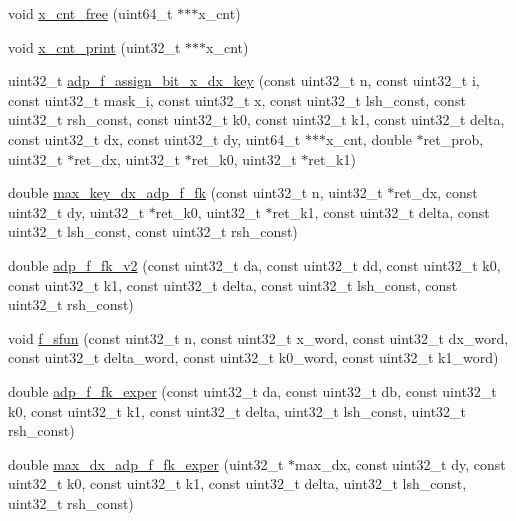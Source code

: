 \begin{DoxyCompactItemize}
void \hyperlink{adp-tea-f-fk_8cc_a0f892e305090fbfd0ff4572ba6930496}{x\-\_\-cnt\-\_\-free} (uint64\-\_\-t $\ast$$\ast$$\ast$x\-\_\-cnt)
\item 
void \hyperlink{adp-tea-f-fk_8cc_a41169fd6ba69f9384b6274c597b473bf}{x\-\_\-cnt\-\_\-print} (uint32\-\_\-t $\ast$$\ast$$\ast$x\-\_\-cnt)
\item 
uint32\-\_\-t \hyperlink{adp-tea-f-fk_8cc_af150550e5c149d5ded3b70aff98e6bd6}{adp\-\_\-f\-\_\-assign\-\_\-bit\-\_\-x\-\_\-dx\-\_\-key} (const uint32\-\_\-t n, const uint32\-\_\-t i, const uint32\-\_\-t mask\-\_\-i, const uint32\-\_\-t x, const uint32\-\_\-t lsh\-\_\-const, const uint32\-\_\-t rsh\-\_\-const, const uint32\-\_\-t k0, const uint32\-\_\-t k1, const uint32\-\_\-t delta, const uint32\-\_\-t dx, const uint32\-\_\-t dy, uint64\-\_\-t $\ast$$\ast$$\ast$x\-\_\-cnt, double $\ast$ret\-\_\-prob, uint32\-\_\-t $\ast$ret\-\_\-dx, uint32\-\_\-t $\ast$ret\-\_\-k0, uint32\-\_\-t $\ast$ret\-\_\-k1)
\item 
double \hyperlink{adp-tea-f-fk_8cc_ad6c768555117904c05a4a4b6b289f5c0}{max\-\_\-key\-\_\-dx\-\_\-adp\-\_\-f\-\_\-fk} (const uint32\-\_\-t n, uint32\-\_\-t $\ast$ret\-\_\-dx, const uint32\-\_\-t dy, uint32\-\_\-t $\ast$ret\-\_\-k0, uint32\-\_\-t $\ast$ret\-\_\-k1, const uint32\-\_\-t delta, const uint32\-\_\-t lsh\-\_\-const, const uint32\-\_\-t rsh\-\_\-const)
\item 
double \hyperlink{adp-tea-f-fk_8cc_a0eb20434ffabc8e299f69786b8ff6a43}{adp\-\_\-f\-\_\-fk\-\_\-v2} (const uint32\-\_\-t da, const uint32\-\_\-t dd, const uint32\-\_\-t k0, const uint32\-\_\-t k1, const uint32\-\_\-t delta, const uint32\-\_\-t lsh\-\_\-const, const uint32\-\_\-t rsh\-\_\-const)
\item 
void \hyperlink{adp-tea-f-fk_8cc_aec0b210e6e32237337038b416e4566d1}{f\-\_\-sfun} (const uint32\-\_\-t n, const uint32\-\_\-t x\-\_\-word, const uint32\-\_\-t dx\-\_\-word, const uint32\-\_\-t delta\-\_\-word, const uint32\-\_\-t k0\-\_\-word, const uint32\-\_\-t k1\-\_\-word)
\item 
double \hyperlink{adp-tea-f-fk_8cc_a32817c473c18fcb887021664b22afca5}{adp\-\_\-f\-\_\-fk\-\_\-exper} (const uint32\-\_\-t da, const uint32\-\_\-t db, const uint32\-\_\-t k0, const uint32\-\_\-t k1, const uint32\-\_\-t delta, uint32\-\_\-t lsh\-\_\-const, uint32\-\_\-t rsh\-\_\-const)
\item 
double \hyperlink{adp-tea-f-fk_8cc_ab86a96e9a2cd0282189dd994003e201e}{max\-\_\-dx\-\_\-adp\-\_\-f\-\_\-fk\-\_\-exper} (uint32\-\_\-t $\ast$max\-\_\-dx, const uint32\-\_\-t dy, const uint32\-\_\-t k0, const uint32\-\_\-t k1, const uint32\-\_\-t delta, uint32\-\_\-t lsh\-\_\-const, uint32\-\_\-t rsh\-\_\-const)

\end{DoxyCompactItemize}
